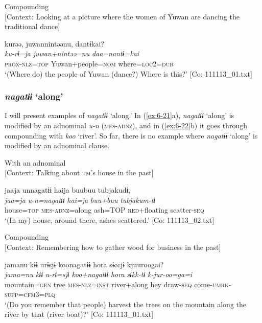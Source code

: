 \ex Compounding\\{}
[Context: Looking at a picture where the women of Yuwan are dancing the traditional dance]

{\TM}
\glll kurəə,  juwannintəənu,  dantɨkai?\\
      \textit{ku-rɨ=ja}  \textit{juwan+nintəə=nu}  \textit{daa=nantɨ=kai}\\
      \textsc{prox}-\textsc{nlz}=\textsc{top}  Yuwan+people=\textsc{nom}  where=\textsc{loc}2=\textsc{dub}\\
\glt ‘(Where do) the people of Yuwan (dance?) Where is this?’ [Co: 111113\_01.txt]
\z

\subsubsection{\textit{nagatɨɨ} ‘along’}

I will present examples of \textit{nagatɨɨ} ‘along.’ In (\ref{ex:6-21}a), \textit{nagatɨɨ} ‘along’ is modified by an adnominal \textit{u-n} (\textsc{mes}-\textsc{adnz}), and in (\ref{ex:6-22}b) it goes through compounding with \textit{koo} ‘river’. So far, there is no example where \textit{nagatɨɨ} ‘along’ is modified by an adnominal clause.

\ea\label{ex:6-22}
\ea With an adnominal\\{}
[Context: Talking about \textsc{tm}’s house in the past]

{\TM}
\glll jaaja  unnagatɨɨ  haija  buubuu  tubjakudɨ,\\
      \textit{jaa=ja}  \textit{u-n=nagatɨɨ}  \textit{hai=ja}  \textit{buu+buu}  \textit{tubjakum-tɨ}\\
      house=\textsc{top}  \textsc{mes}-\textsc{adnz}=along  ash=TOP  \textsc{red}+floating  scatter-\textsc{seq}\\
\glt ‘(In my) house, around there, ashes scattered.’ [Co: 111113\_02.txt]
\z

\ex Compounding\\{}
[Context: Remembering how to gather wood for business in the past]

{\TM}
\glll jamanu  kɨɨ  urɨsjɨ  koonagatɨɨ  {\textbar}hora{\textbar}   sɨccjɨ  kjuuroogai?\\
      \textit{jama=nu}  \textit{kɨɨ}  \textit{u-rɨ=sjɨ}  \textit{koo+nagatɨɨ}  \textit{hora}   \textit{sɨkk-tɨ}  \textit{k-jur-oo=ga=i}\\
      mountain=\textsc{gen}  tree  \textsc{mes}-\textsc{nlz}=\textsc{inst}  river+along  hey  draw-\textsc{seq}  come-\textsc{umrk}-\textsc{supp}=\textsc{cfm}3=\textsc{plq}\\
\glt ‘(Do you remember that people) harvest the trees on the mountain along the river by that (river boat)?’ [Co: 111113\_01.txt]
\z

